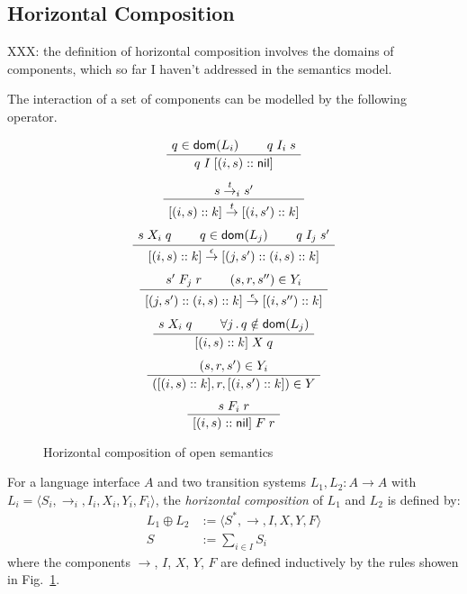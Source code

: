 \documentclass[sigplan,10pt,review,anonymous]{acmart}
\newcommand{\kw}[1]{\ensuremath{ \mathsf{#1} }}
\begin{document}
\subsection{Horizontal Composition} \label{sec:sem:linker} %

XXX: the definition of horizontal composition involves
the domains of components,
which so far I haven't addressed in the semantics model.

The interaction of a set of components
can be modelled by the following operator.

\begin{figure} %
    \begin{gather*}
        \AxiomC{$q \in \kw{dom}(L_i)$}
        \AxiomC{$q \mathrel{I_i} s$}
        \BinaryInfC{$q \mathrel{I} [(i, s) :: \kw{nil}]$}
        \DisplayProof
        \\[1ex]
        \AxiomC{$s \stackrel{t}{\rightarrow}_i s'$}
        \UnaryInfC{$
            [(i, s) :: k]
            \stackrel{t}{\rightarrow}
            [(i, s') :: k]$}
        \DisplayProof
        \\[1ex]
        \AxiomC{$s \mathrel{X_i} q$}
        \AxiomC{$q \in \kw{dom}(L_j)$}
        \AxiomC{$q \mathrel{I_j} s'$}
        \TrinaryInfC{$
            [(i, s) :: k]
            \stackrel{\epsilon}{\rightarrow}
            [(j, s') :: (i, s) :: k]$}
        \DisplayProof
        \\[1ex]
        \AxiomC{$s' \mathrel{F_j} r$}
        \AxiomC{$(s, r, s'') \in Y_i$}
        \BinaryInfC{$
            [(j, s') :: (i, s) :: k]
            \stackrel{\epsilon}{\rightarrow}
            [(i, s'') :: k]$}
        \DisplayProof
        \\[1ex]
        \AxiomC{$s \mathrel{X_i} q$}
        \AxiomC{$\forall j \,.\, q \notin \kw{dom}(L_j)$}
        \BinaryInfC{$[(i, s) :: k] \mathrel{X} q$}
        \DisplayProof
        \\[1ex]
        \AxiomC{$(s, r, s') \in Y_i$}
        \UnaryInfC{$([(i, s) :: k], r, [(i, s') :: k]) \in Y$}
        \DisplayProof
        \\[1ex]
        \AxiomC{$s \mathrel{F_i} r$}
        \UnaryInfC{$[(i, s) :: \kw{nil}] \mathrel{F} r$}
        \DisplayProof
    \end{gather*}
    \caption{Horizontal composition of open semantics}
    \label{fig:hcomp}
\end{figure}

\begin{definition} \label{def:hcomp} %
For a language interface $A$
and two transition systems $L_1, L_2 : A \rightarrow A$
with
$L_i = \langle S_i, {\rightarrow}_i, I_i, X_i, Y_i, F_i \rangle$,
the \emph{horizontal composition} of $L_1$ and $L_2$
is defined by:
\begin{align*}
    L_1 \oplus L_2 &:= \langle S^*, {\rightarrow}, I, X, Y, F \rangle \\
    S &:= \sum_{i \in I} S_i
\end{align*}
where the components $\rightarrow$, $I$, $X$, $Y$, $F$
are defined inductively by 
the rules showen in Fig.~\ref{fig:hcomp}.
\end{definition}
\end{document}

